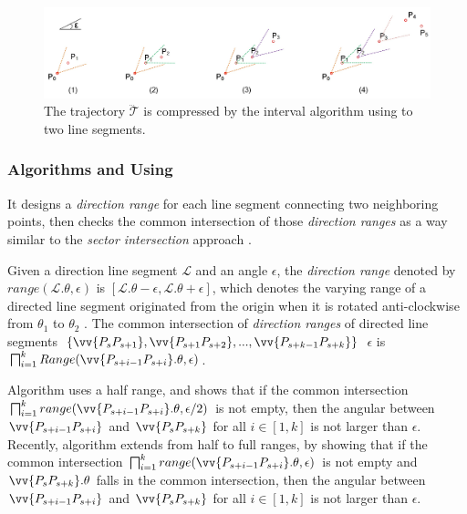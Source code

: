 \begin{figure}[tb!]
	\centering
	\includegraphics[scale=0.66]{Figures/Fig-interval.jpg}
	\vspace{-1ex}
	\caption{\small The trajectory $\dddot{\mathcal{T}}$ is compressed by the interval algorithm using \dad to two line segments.}
	\vspace{-1ex}
	\label{fig:interval}
\end{figure}




\subsubsection{Algorithms \intersec \cite{Long:Direction} and \interval \cite{Ke:Interval} Using \dad}
It designs a \emph{direction range} for each line segment connecting two neighboring points, then checks the common intersection of those \emph{direction ranges} as a way similar to the \emph{sector intersection} approach \cite{Williams:Longest, Sklansky:Cone, Dunham:Cone, Zhao:Sleeve}.

Given a direction line segment $\mathcal{L}$ and an angle $\epsilon$, the \emph{direction range} denoted by $range(\mathcal{L}.\theta, \epsilon)$ is $[\mathcal{L}.\theta-\epsilon, \mathcal{L}.\theta+\epsilon]$, which denotes the varying range of a directed line segment originated from the origin when it is rotated anti-clockwise from $\theta_1$ to $\theta_2$  \cite{Long:Direction}.
%
The {common intersection} of \emph{direction ranges} of directed line segments $\{\vv{P_sP_{s+1}}, \vv{P_{s+1}P_{s+2}}, ..., \vv{P_{s+k-1}P_{s+k}}\}$ \wrt $\epsilon$ is $\bigsqcap_{i=1}^{k}Range(\vv{P_{s+i-1} P_{s+i}}.\theta, \epsilon)$.

Algorithm \intersec\cite{Long:Direction} uses a half range, and shows that if the {common intersection} $\bigsqcap_{i=1}^{k}range(\vv{P_{s+i-1} P_{s+i}}.\theta, \epsilon/2)$ is not empty, then the angular between $\vv{P_{s+i-1}P_{s+i}}$ and $\vv{P_sP_{s+k}}$ for all $i\in [1, k]$ is not larger than $\epsilon$.
%
Recently, algorithm \interval \cite{Ke:Interval} extends \intersec from half to full ranges, by showing that if the {common intersection} $\bigsqcap_{i=1}^{k}range(\vv{P_{s+i-1} P_{s+i}}.\theta, \epsilon)$ is not empty and $\vv{P_sP_{s+k}}.\theta$ falls in the {common intersection}, then the angular between $\vv{P_{s+i-1}P_{s+i}}$ and $\vv{P_sP_{s+k}}$ for all $i\in [1, k]$ is not larger than $\epsilon$.


